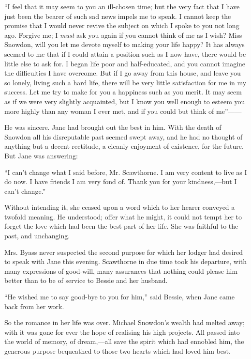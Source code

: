 ``I feel that it may seem to you an ill-chosen time; but the very fact
that I have just been the bearer of such sad news impels me to speak. I
cannot keep the promise that I would never revive the subject on which I
spoke to you not long ago. Forgive me; I \emph{must} ask you again if
you cannot think of me as I wish? Miss Snowdon, will you let me devote
myself to making your life happy? It has always seemed to me that if I
could attain a position such as I now have, there would be little else
to ask for. I began life poor and half-educated, and you cannot imagine
the difficulties I have overcome. But if I go away from this house, and
leave you so lonely, living such a hard life, there will be very
{}little satisfaction for me in my success. Let me try to make for you a
happiness such as you merit. It may seem as if we were very slightly
acquainted, but I know you well enough to esteem you more highly than
any woman I ever met, and if you could but think of {me''{{------}}}

He was sincere. Jane had brought out the best in him. With the death of
Snowdon all his disreputable past seemed swept away, and he had no
thought of anything but a decent rectitude, a cleanly enjoyment of
existence, for the future. But Jane was answering:

``I can't change what I said before, Mr. Scawthorne. I am very content
to live as I do now. I have friends I am very fond of. Thank you for
your kindness,---but I can't change.''

Without intending it, she ceased upon a word which to her hearer
conveyed a twofold meaning. He understood; offer what he might, it could
not tempt her to forget the love which had been the best part of her
life. She was faithful to the past, and unchanging.

Mrs. Byass never suspected the second purpose for which her lodger had
desired to speak {}with Jane this evening. Scawthorne in due time took
his departure, with many expressions of good-will, many assurances that
nothing could please him better than to be of service to Bessie and her
husband.

``He wished me to say good-bye to you for him,'' said Bessie, when Jane
came back from her work.

So the romance in her life was over. Michael Snowdon's wealth had melted
away; with it was gone for ever the hope of realising his high projects.
All passed into the world of memory, of dream,---all save the spirit
which had ennobled him, the generous purpose bequeathed to those two
hearts which had loved him best.


